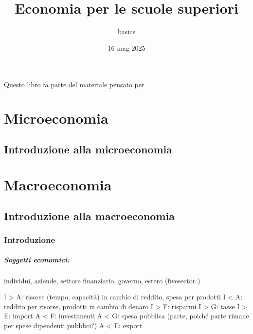 \documentclass[letterpaper,10pt,italian]{jupyterBook}
\title{Economia per le scuole superiori}
\date{16 mag 2025}
\author{basics}
\begin{document}
\pagestyle{empty}
\sphinxmaketitle
\pagestyle{plain}
\sphinxtableofcontents
\pagestyle{normal}
\label{\detokenize{intro::doc}}


\sphinxAtStartPar
Questo libro fa parte del materiale pensato per 





\sphinxstepscope


\part{Microeconomia}

\sphinxstepscope


\chapter{Introduzione alla microeconomia}
\label{\detokenize{ch/micro:introduzione-alla-microeconomia}}\label{\detokenize{ch/micro:economics-hs-micro}}\label{\detokenize{ch/micro::doc}}
\sphinxstepscope


\part{Macroeconomia}

\sphinxstepscope


\chapter{Introduzione alla macroeconomia}
\label{\detokenize{ch/macro:introduzione-alla-macroeconomia}}\label{\detokenize{ch/macro:economics-hs-macro}}\label{\detokenize{ch/macro::doc}}

\section{Introduzione}
\label{\detokenize{ch/macro:introduzione}}\label{\detokenize{ch/macro:economics-hs-macro-intro}}\subsubsection*{Soggetti economici:}

\sphinxAtStartPar
individui, aziende, settore finanziario, governo, estero (five\sphinxhyphen{}sector )

\sphinxAtStartPar
I \sphinxhyphen{}> A: risorse (tempo, capacità) in cambio di reddito, spesa per prodotti
I <\sphinxhyphen{} A: reddito per risorse, prodotti in cambio di denaro
I \sphinxhyphen{}> F: risparmi
I \sphinxhyphen{}> G: tasse
I \sphinxhyphen{}> E: import
A <\sphinxhyphen{} F: investimenti
A <\sphinxhyphen{} G: spesa pubblica (parte, poiché parte rimane per spese dipendenti pubblici?)
A <\sphinxhyphen{} E: export
\end{document}
